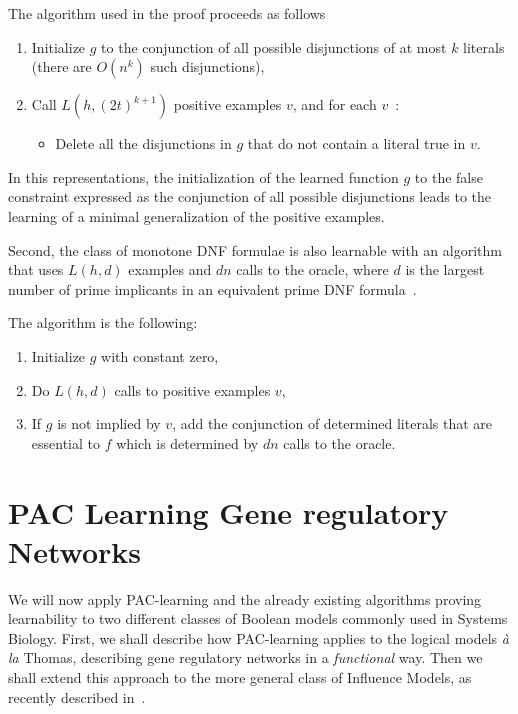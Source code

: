 \documentclass{llncs}
\begin{document}
The algorithm used in the proof proceeds as follows
\begin{enumerate}
  \item Initialize $g$ to the conjunction of all possible disjunctions of at most $k$ literals (there are $O(n^k)$ such disjunctions),
\item Call $L(h,(2t)^{k+1})$ positive examples $v$, and for each $v$~:
\begin{itemize}
\item Delete all the disjunctions in $g$ that do not contain a literal true in $v$.	
\end{itemize}

\end{enumerate}

In this representations, the initialization of the learned function $g$ to the false constraint expressed as the conjunction of all possible disjunctions
leads to the learning of a minimal  generalization of the positive examples.


\begin{theorem}
    Second, the class of monotone DNF formulae is also learnable with an
    algorithm that uses $L(h,d)$ examples and $d n$ calls to the oracle,
    where $d$ is the largest number of prime implicants in an equivalent prime DNF formula~\cite{Valiant84cacm}.
\end{theorem}

The algorithm is the following:
\begin{enumerate}
\item Initialize $g$ with constant zero,
\item
Do $L(h,d)$ calls to positive examples $v$,
\item
If $g$ is not implied by $v$, add the conjunction of determined literals that
are essential to $f$ which is determined by $d n$ calls to the oracle.
\end{enumerate}

\section{PAC Learning Gene regulatory Networks}

We will now apply PAC-learning and the already existing algorithms proving
learnability to two different classes of Boolean models commonly used in
Systems Biology. First, we shall describe how PAC-learning applies to the
logical models \emph{\`a la} Thomas, describing gene regulatory networks in a
\emph{functional} way. Then we shall extend this approach to the more general
class of Influence Models, as recently described in~\cite{FMRS16cmsb}.
\end{document}
